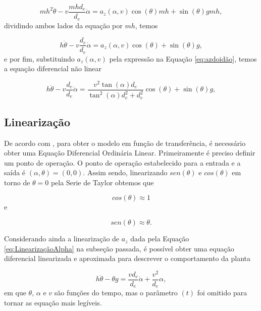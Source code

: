         \begin{equation}
            mh^2 \ddot \theta - v\frac{mhd_c}{d_e}\dot \alpha = a_z(\alpha,v) \cos(\theta)mh + \sin(\theta)gmh,
        \end{equation}
        dividindo ambos lados da equação por $mh$, temos

        \begin{equation}
            h \ddot \theta - v\frac{d_c}{d_e}\dot \alpha = a_z(\alpha,v) \cos(\theta) + \sin(\theta)g,
        \end{equation}
        e por fim, substituindo $a_z(\alpha,v)$ pela expressão na Equação \eqref{eq:azdoidão}, temos a equação diferencial não linear
        
        \begin{equation}
            h \ddot \theta - v\frac{d_c}{d_e}\dot \alpha = \frac{v^2\tan(\alpha)d_e}{\tan^2(\alpha)d_c^2+d_e^2} \cos(\theta) + \sin(\theta)g,
        \end{equation}
        
        \subsection{Linearização}
        
            De acordo com \cite{book:dorf}, para obter o modelo em função de transferência, é necessário obter uma Equação Diferencial Ordinária Linear. Primeiramente é preciso definir um ponto de operação. O ponto de operação estabelecido para a entrada e a saída é $(\alpha,\theta)=(0,0)$. Assim sendo, linearizando $sen(\theta)$ e $cos(\theta)$ em torno de $\theta=0$ pela Serie de Taylor obtemos que
            
            \begin{equation}
                cos(\theta) \approx 1
            \end{equation}
            e
            
            \begin{equation}
                sen(\theta) \approx \theta. 
            \end{equation}
            
            Considerando ainda a linearização de $a_z$ dada pela Equação \eqref{eq:LinearizaçãoAlpha} na subseção passada, é possível obter uma equação diferencial linearizada e aproximada para descrever o comportamento da planta
            
            \begin{equation}
                h \ddot \theta -\theta g = \frac{vd_c}{d_e}\dot \alpha +\frac{v^2}{d_e}\alpha,
                \label{eq:edopendulolinear}
            \end{equation}
            em que $\theta$, $\alpha$ e $v$ são funções do tempo, mas o parâmetro $(t)$ foi omitido para tornar as equação mais legíveis.
            
